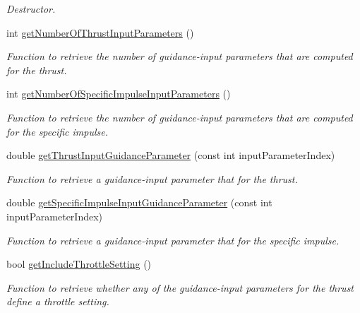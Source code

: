 \begin{DoxyCompactItemize}
\begin{DoxyCompactList}\small\item\em Destructor. \end{DoxyCompactList}\item 
int \hyperlink{classtudat_1_1simulation__setup_1_1ThrustInputParameterGuidance_a6ac28e0721f2596e952743ebe7e15563}{get\+Number\+Of\+Thrust\+Input\+Parameters} ()
\begin{DoxyCompactList}\small\item\em Function to retrieve the number of guidance-\/input parameters that are computed for the thrust. \end{DoxyCompactList}\item 
int \hyperlink{classtudat_1_1simulation__setup_1_1ThrustInputParameterGuidance_a55354aeee0de70b67311079e958071a7}{get\+Number\+Of\+Specific\+Impulse\+Input\+Parameters} ()
\begin{DoxyCompactList}\small\item\em Function to retrieve the number of guidance-\/input parameters that are computed for the specific impulse. \end{DoxyCompactList}\item 
double \hyperlink{classtudat_1_1simulation__setup_1_1ThrustInputParameterGuidance_a925a916ac013f6afdd22f9f6964c8c3c}{get\+Thrust\+Input\+Guidance\+Parameter} (const int input\+Parameter\+Index)
\begin{DoxyCompactList}\small\item\em Function to retrieve a guidance-\/input parameter that for the thrust. \end{DoxyCompactList}\item 
double \hyperlink{classtudat_1_1simulation__setup_1_1ThrustInputParameterGuidance_a585be4b9929770a24eee59dc564e13d0}{get\+Specific\+Impulse\+Input\+Guidance\+Parameter} (const int input\+Parameter\+Index)
\begin{DoxyCompactList}\small\item\em Function to retrieve a guidance-\/input parameter that for the specific impulse. \end{DoxyCompactList}\item 
bool \hyperlink{classtudat_1_1simulation__setup_1_1ThrustInputParameterGuidance_a967821d13e2239345ac761edfa069774}{get\+Include\+Throttle\+Setting} ()
\begin{DoxyCompactList}\small\item\em Function to retrieve whether any of the guidance-\/input parameters for the thrust define a throttle setting. \end{DoxyCompactList}\item 

\end{DoxyCompactItemize}
